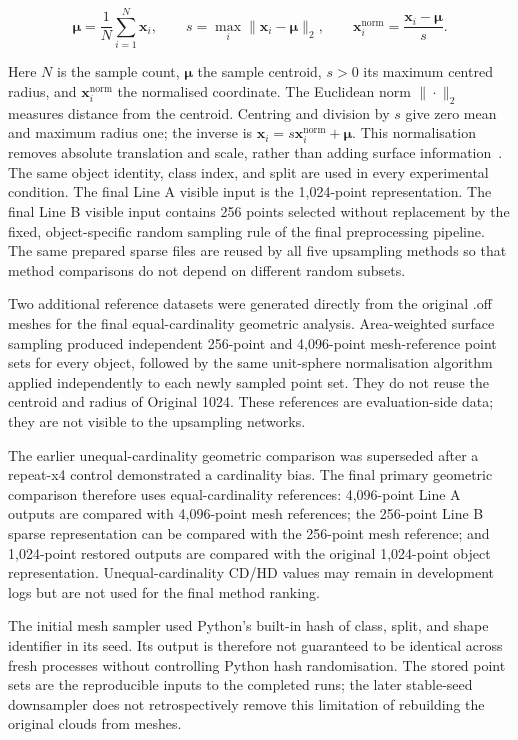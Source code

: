 \begin{equation}
\boldsymbol{\mu}=\frac1N\sum_{i=1}^{N}\mathbf{x}_i,\qquad s=\max_i\|\mathbf{x}_i-\boldsymbol{\mu}\|_2,\qquad \mathbf{x}_i^{\mathrm{norm}}=\frac{\mathbf{x}_i-\boldsymbol{\mu}}{s}.
\label{eq:fc-4-1}
\end{equation}

Here $N$ is the sample count, $\boldsymbol\mu$ the sample centroid,
$s>0$ its maximum centred radius, and $\mathbf x_i^{\mathrm{norm}}$
the normalised coordinate. The Euclidean norm $\|\cdot\|_2$ measures
distance from the centroid. Centring and division by $s$ give zero mean
and maximum radius one; the inverse is
$\mathbf x_i=s\mathbf x_i^{\mathrm{norm}}+\boldsymbol\mu$.
This normalisation removes absolute translation and scale, rather than
adding surface information~\cite{qi2017pointnet}. The same object identity, class index, and split are used in every experimental condition. The final Line A visible input is the 1,024-point representation. The final Line B visible input contains 256 points selected without replacement by the fixed, object-specific random sampling rule of the final preprocessing pipeline. The same prepared sparse files are reused by all five upsampling methods so that method comparisons do not depend on different random subsets.

Two additional reference datasets were generated directly from the original .off meshes for the final equal-cardinality geometric analysis. Area-weighted surface sampling produced independent 256-point and 4,096-point mesh-reference point sets for every object, followed by the same unit-sphere normalisation algorithm applied independently
to each newly sampled point set. They do not reuse the centroid and radius
of Original 1024. These references are evaluation-side data; they are not visible to the upsampling networks.

The earlier unequal-cardinality geometric comparison was superseded after a repeat-x4 control demonstrated a cardinality bias. The final primary geometric comparison therefore uses equal-cardinality references: 4,096-point Line A outputs are compared with 4,096-point mesh references; the 256-point Line B sparse representation can be compared with the 256-point mesh reference; and 1,024-point restored outputs are compared with the original 1,024-point object representation. Unequal-cardinality CD/HD values may remain in development logs but are not used for the final method ranking.

The initial mesh sampler used Python's built-in hash of class, split, and
shape identifier in its seed. Its output is therefore not guaranteed to be
identical across fresh processes without controlling Python hash randomisation.
The stored point sets are the reproducible inputs to the completed runs;
the later stable-seed downsampler does not retrospectively remove this
limitation of rebuilding the original clouds from meshes.

